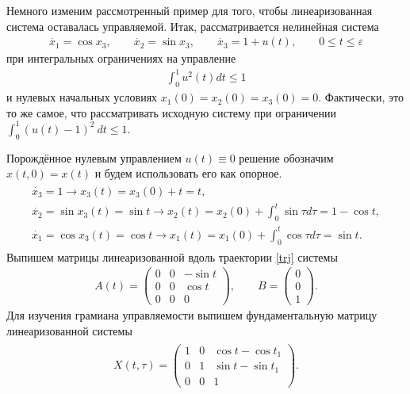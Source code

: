 \documentclass[../main.tex]{subfiles}
\begin{document}
 Немного изменим рассмотренный пример для того, чтобы линеаризованная система оставалась управляемой. 
Итак, рассматривается нелинейная система
 \begin{gather}\label{unicycle1}
 \dot{x_1} = \cos x_3, \qquad
 \dot{x_2} = \sin x_3, \qquad
 \dot{x_3} = 1 + u(t), \qquad 0 \leqslant t \leqslant \varepsilon
 \end{gather}
 при интегральных ограничениях на управление 
 \begin{gather*}
 \int_0^1 u^2(t) dt \leqslant 1
 \end{gather*}
 и нулевых начальных условиях $ x_1(0) = x_2(0) = x_3(0) = 0 $. 
Фактически, это то же самое, что рассматривать исходную систему при ограничении $ \displaystyle{\int_0^1} \left( u(t) - 1\right)^2 \ dt \leqslant 1$.
 
 Порождённое нулевым управлением $ u(t) \equiv 0 $ решение обозначим $ x(t,0) = x(t) $ и будем использовать его как опорное. 
 \begin{gather}\label{trj}
 \begin{gathered}
 \dot{x_3} = 1 \longrightarrow x_3(t) = x_3(0) + t = t, \\
 \dot{x_2} = \sin x_3(t) = \sin t \longrightarrow x_2(t) = x_2(0) + \int_0^t \sin \tau d\tau = 1 - \cos t,\\
 \dot{x_1} = \cos x_3(t) = \cos t \longrightarrow x_1(t) = x_1(0) + \int_0^t \cos \tau d\tau = \sin t.
 \end{gathered}
 \end{gather}
 Выпишем матрицы линеаризованной вдоль траектории \eqref{trj} системы 
 \begin{gather*}
 A(t) = \begin{pmatrix}
 0 & 0 & -\sin t \\ 
 0 & 0 & \cos t \\ 
 0 & 0 & 0
 \end{pmatrix}, \qquad B = \begin{pmatrix}
 0 \\ 
 0 \\ 
 1
 \end{pmatrix}.
 \end{gather*}
 Для изучения грамиана управляемости выпишем фундаментальную матрицу линеаризованной системы
 \begin{gather*}
 \begin{gathered}
 X(t,\tau) = \begin{pmatrix}
 1 & 0 & \cos t-\cos t_1 \\ 
 0 & 1 & \sin t-\sin t_1 \\ 
 0 & 0 & 1
 \end{pmatrix}.
 \end{gathered} 
 \end{gather*}
\end{document}
